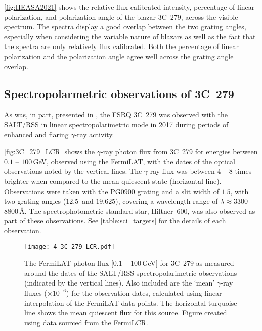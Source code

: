 \autoref{fig:HEASA2021} shows the relative flux calibrated intensity, percentage of linear polarization, and polarization angle of the blazar 3C~279, across the visible spectrum.
The spectra display a good overlap between the two grating angles, especially when considering the variable nature of blazars as well as the fact that the spectra are only relatively flux calibrated.
Both the percentage of linear polarization and the polarization angle agree well across the grating angle overlap.

\pagebreak

\subsection{Spectropolarmetric observations of 3C~279}

As was, in part, presented in  \citet[][see also \autoref{app:papers}]{Cooper_HEASA2022}, the \gls{FSRQ} 3C~279 was observed with the \gls{SALT}/\gls{RSS} in linear spectropolarimetric mode in 2017 during periods of enhanced and flaring $\gamma$-ray activity.

\autoref{fig:3C_279_LCR} shows the $\gamma$-ray photon flux from 3C~279 for energies between $0.1$ -- $100$\,GeV, observed using the \gls{FermiLAT},\footnotemark{} with the dates of the optical observations noted by the vertical lines.
%
The $\gamma$-ray flux was between $4$ -- $8$ times brighter when compared to the mean quiescent state (horizontal line).
Observations were taken with the PG$0900$ grating and a slit width of $1.5$\arcsec\!\!\!, with two grating angles ($12.5$\degree\ and $19.625$\degree), covering a wavelength range of $\lambda \approx 3300$ -- $8800$\,\AA.
The spectrophotometric standard star, Hiltner~$600$, was also observed as part of these observations.
See \autoref{table:sci_targets} for the details of each observation.

\begin{figure}[t]
    \centering
    \texttt{[image: 4\_3C\_279\_LCR.pdf]}
    \caption{
        The \gls{FermiLAT} photon flux [$0.1$ -- $100$\,GeV] for 3C~$279$ as measured around the dates of the \gls{SALT}/\gls{RSS} spectropolarimetric observations (indicated by the vertical lines).
        Also included are the `mean' $\gamma$-ray fluxes ($\times 10^{-6}$) for the observation dates, calculated using linear interpolation of the \gls{FermiLAT} data points.
        The horizontal turquoise line shows the mean quiescent flux for this source.
        Figure created using data sourced from the \gls{FermiLCR}.\protect\footnotemark{}
    }
    \label{fig:3C_279_LCR}
\end{figure}

